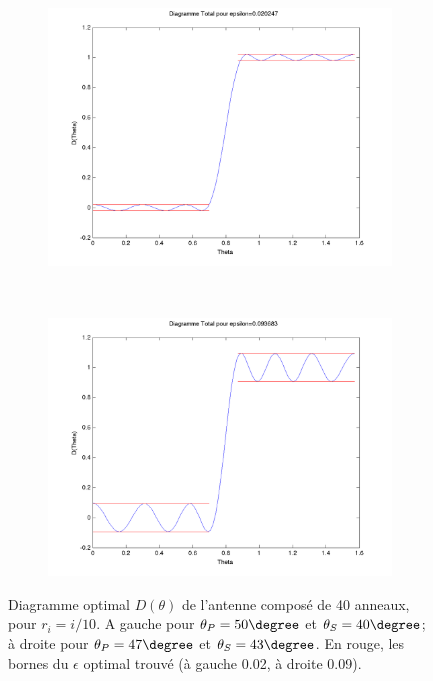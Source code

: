 \begin{figure}[h!]
  \centering
  \begin{subfigure}[b]{0.45\textwidth}
  \includegraphics[width=\textwidth]{D-ModLin.png}
  \caption{}
  \label{fig:D-ModLin}
  \end{subfigure}%
  ~ 
  \begin{subfigure}[b]{0.45\textwidth}
  \includegraphics[width=\textwidth]{D-ModLin-Rapproche.png}
  \caption{}
  \label{fig:D-ModLin-Rapproche}
  \end{subfigure}
  \caption{Diagramme optimal $D(\theta)$ de l'antenne composé de 40 anneaux, pour $r_i=i/10$. A gauche pour $\theta_P=50 \degree$ et $\theta_S=40 \degree$; à droite pour $\theta_P=47 \degree$ et $\theta_S=43 \degree$. En rouge, les bornes du $\epsilon$ optimal trouvé (à gauche 0.02, à droite 0.09).}
  \end{figure}


